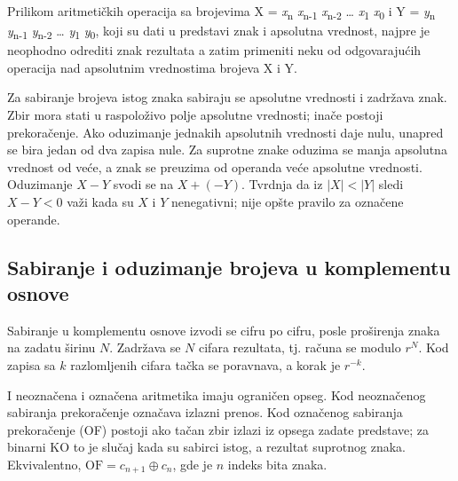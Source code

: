 \documentclass[a4paper,11pt]{article}
\numberwithin{equation}{section}
\begin{document}
Prilikom aritmetičkih operacija sa brojevima X = \emph{x}\textsubscript{n} \emph{x}\textsubscript{n-1} \emph{x}\textsubscript{n-2} \ldots{} \emph{x}\textsubscript{1} \emph{x}\textsubscript{0} i Y = \emph{y}\textsubscript{n} \emph{y}\textsubscript{n-1} \emph{y}\textsubscript{n-2} \ldots{} \emph{y}\textsubscript{1} \emph{y}\textsubscript{0}, koji su dati u predstavi znak i apsolutna vrednost, najpre je neophodno odrediti znak rezultata a zatim primeniti neku od odgovarajućih operacija nad apsolutnim vrednostima brojeva X i Y.



Za sabiranje brojeva istog znaka sabiraju se apsolutne vrednosti i zadržava znak. Zbir mora stati u raspoloživo polje apsolutne vrednosti; inače postoji prekoračenje. Ako oduzimanje jednakih apsolutnih vrednosti daje nulu, unapred se bira jedan od dva zapisa nule. Za suprotne znake oduzima se manja apsolutna vrednost od veće, a znak se preuzima od operanda veće apsolutne vrednosti. Oduzimanje $X-Y$ svodi se na $X+(-Y)$. Tvrdnja da iz $|X|<|Y|$ sledi $X-Y<0$ važi kada su $X$ i $Y$ nenegativni; nije opšte pravilo za označene operande.

\FloatBarrier
\subsection{Sabiranje i oduzimanje brojeva u komplementu osnove}\label{sec:1.3}


Sabiranje u komplementu osnove izvodi se cifru po cifru, posle proširenja znaka na zadatu širinu $N$. Zadržava se $N$ cifara rezultata, tj. računa se modulo $r^N$. Kod zapisa sa $k$ razlomljenih cifara tačka se poravnava, a korak je $r^{-k}$.

I neoznačena i označena aritmetika imaju ograničen opseg. Kod neoznačenog sabiranja prekoračenje označava izlazni prenos. Kod označenog sabiranja prekoračenje (OF) postoji ako tačan zbir izlazi iz opsega zadate predstave; za binarni KO to je slučaj kada su sabirci istog, a rezultat suprotnog znaka. Ekvivalentno, $\mathrm{OF}=c_{n+1}\oplus c_n$, gde je $n$ indeks bita znaka.
\end{document}
